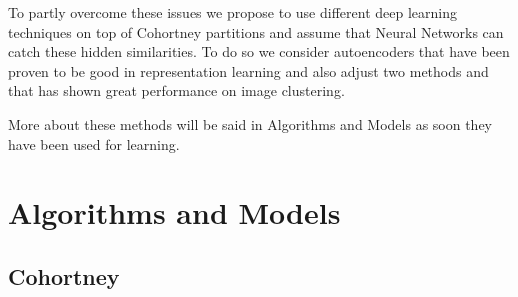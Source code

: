 \documentclass[10pt]{article}
\begin{document}
To partly overcome these issues we propose to use different deep learning techniques on top of Cohortney partitions and assume that Neural Networks can catch these hidden similarities. To do so we consider autoencoders that have been proven to be good in representation learning and also adjust two methods \cite{guo2017deep} and \cite{asano2020self} that has shown great performance on image clustering.

More about these methods will be said in Algorithms and Models as soon they have been used for learning.

\section{Algorithms and Models}\label{sec:algos}




\subsection{Cohortney}\label{sec:cohortney}
\end{document}
